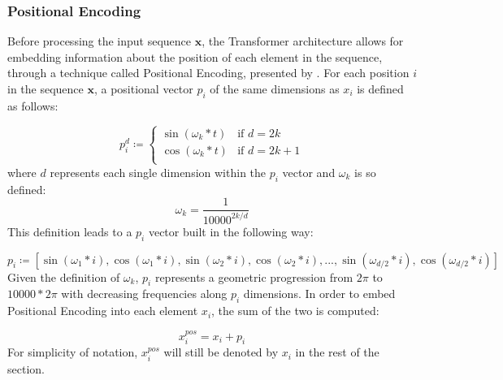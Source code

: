             \subsubsection{Positional Encoding}
                Before processing the input sequence $\mathbf{x}$, the Transformer architecture allows for embedding information about the position of each element in the sequence, through a technique called Positional Encoding, presented by .\newline
                For each position $i$ in the sequence $\mathbf{x}$, a positional vector $p_i$ of the same dimensions as $x_{i}$ is defined as follows:
                
                \begin{equation}
                    \label{eq:pos_enc}
                    p_{i}^{d} \coloneqq \begin{cases}
                                            \sin(\omega_k * t) & \text{if } d = 2k\\
                                            \cos(\omega_k * t) & \text{if } d = 2k + 1\\ 
                                        \end{cases}
                \end{equation}
                where $d$ represents each single dimension within the $p_i$ vector and $\omega_k$ is so defined:
                \[ \omega_k = \frac{1}{10000^{2k/d}} \]
                This definition leads to a $p_i$ vector built in the following way:
                
                \[ p_i \coloneqq \left[ \sin(\omega_1 * i), \cos(\omega_1 * i), \sin(\omega_2 * i), \cos(\omega_2 * i), ..., \sin(\omega_{d/2} * i), \cos(\omega_{d/2} * i)\right] \]
                \noindent
                Given the definition of $\omega_k$, $p_i$ represents a geometric progression from $2\pi$ to $10000*2\pi$ with decreasing frequencies along $p_i$ dimensions. In order to embed Positional Encoding into each element $x_{i}$, the sum of the two is computed: 
                
                \[ x_{i}^{pos} = x_{i} + p_i \]
                \noindent
                For simplicity of notation, $x_{i}^{pos}$ will still be denoted by $x_{i}$ in the rest of the section. 
            
